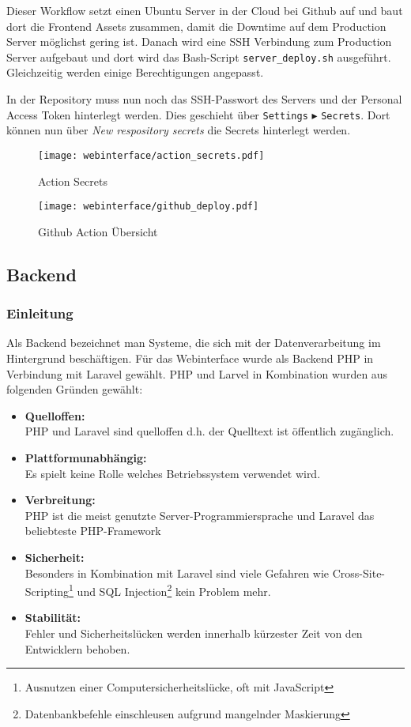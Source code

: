 Dieser Workflow setzt einen Ubuntu Server in der Cloud bei Github auf und baut
dort die Frontend Assets zusammen, damit die Downtime auf dem Production Server
möglichst gering ist. Danach wird eine SSH Verbindung zum Production Server
aufgebaut und dort wird das Bash-Script \verb|server_deploy.sh| ausgeführt.
Gleichzeitig werden einige Berechtigungen angepasst.

In der Repository muss nun noch das SSH-Passwort des Servers und der Personal Access Token
hinterlegt werden. Dies geschieht über \verb|Settings| $\blacktriangleright$
\verb|Secrets|. Dort können nun über \textit{New respository secrets} die Secrets
hinterlegt werden.

\begin{figure}[H]
  \centering
  \texttt{[image: webinterface/action\_secrets.pdf]}
  \caption{Action Secrets}
\end{figure}

\begin{figure}[H]
  \centering
  \texttt{[image: webinterface/github\_deploy.pdf]}
  \caption{Github Action Übersicht}
\end{figure}

\subsection{Backend}

\subsubsection{Einleitung}
Als Backend bezeichnet man Systeme, die sich mit der Datenverarbeitung im
Hintergrund beschäftigen. Für das Webinterface wurde als Backend PHP in
Verbindung mit Laravel gewählt. PHP und Larvel in Kombination wurden aus
folgenden Gründen gewählt:

\begin{itemize}
  \item \textbf{Quelloffen:}\\
  PHP und Laravel sind quelloffen d.h. der Quelltext ist öffentlich zugänglich.
  \item \textbf{Plattformunabhängig:}\\
  Es spielt keine Rolle welches Betriebssystem verwendet wird.
  \item \textbf{Verbreitung:}\\
  PHP ist die meist genutzte Server-Programmiersprache und Laravel das
  beliebteste PHP-Framework
  \item \textbf{Sicherheit:}\\
  Besonders in Kombination mit Laravel sind viele Gefahren wie
  Cross-Site-Scripting\footnote{Ausnutzen einer Computersicherheitslücke, oft
  mit JavaScript} und SQL Injection\footnote{Datenbankbefehle einschleusen
  aufgrund mangelnder Maskierung} kein Problem mehr.
  \item \textbf{Stabilität:}\\
  Fehler und Sicherheitslücken werden innerhalb kürzester Zeit von den
  Entwicklern behoben.
\end{itemize}

